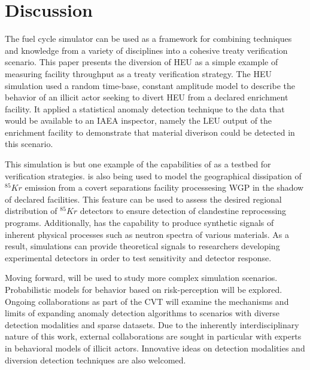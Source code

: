 \section{Discussion}
\label{s_dis}

The \Cyclus fuel cycle simulator can be used as a framework for combining techniques and knowledge from a variety of disciplines into a cohesive treaty verification scenario. This paper presents the diversion of \gls{HEU} as a simple example of measuring facility throughput as a treaty verification strategy.  The \gls{HEU} simulation used a random time-base, constant amplitude model to describe the behavior of an illicit actor seeking to divert \gls{HEU} from a declared enrichment facility.  It applied a statistical anomaly detection technique to the data that would be available to an \gls{IAEA} inspector, namely the \gls{LEU} output of the enrichment facility to demonstrate that material diverison could be detected in this scenario.

This simulation is but one example of the capabilities of \Cyclus as a testbed for verification strategies.  \Cyclus is also being used to model the geographical dissipation of $^{85}Kr$ emission from a covert separations facility processesing \gls{WGP} in the shadow of declared facilities.  This feature can be used to assess the desired regional distribution of $^{85}Kr$ detectors to ensure detection of clandestine reprocessing programs.  Additionally, \Cyclus has the capability to produce synthetic signals of inherent physical processes such as neutron spectra of various materials.  As a result, \Cyclus simulations can provide theoretical signals to researchers developing experimental detectors in order to test sensitivity and detector response.

Moving forward, \Cyclus will be used to study more complex simulation scenarios.  Probabilistic models for behavior based on risk-perception will be explored.  Ongoing collaborations as part of the \gls{CVT} will examine the mechanisms and limits of expanding anomaly detection algorithms to scenarios with diverse detection modalities and sparse datasets.  Due to the inherently interdisciplinary nature of this work, external collaborations are sought in particular with experts in behavioral models of illicit actors. Innovative ideas on detection modalities and diversion detection techniques are also welcomed.



\textit{}